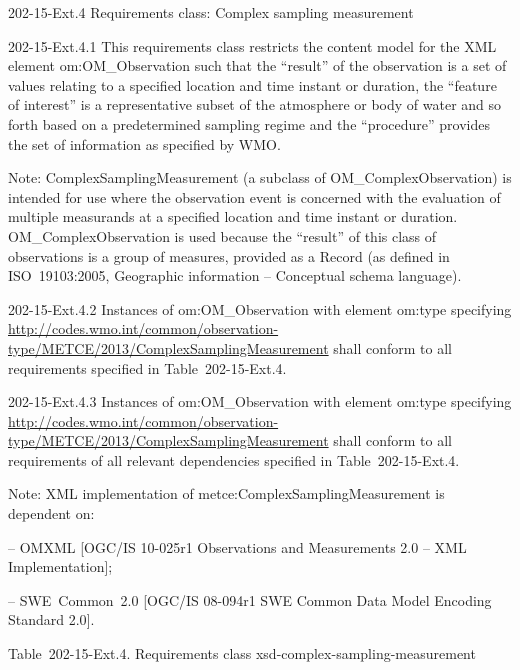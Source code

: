 202-15-Ext.4 Requirements class: Complex sampling measurement

202-15-Ext.4.1 This requirements class restricts the content model for the XML element om:OM\_Observation such that the ``result'' of the observation is a set of values relating to a specified location and time instant or duration, the ``feature of interest'' is a representative subset of the atmosphere or body of water and so forth based on a predetermined sampling regime and the ``procedure'' provides the set of information as specified by WMO.

Note: ComplexSamplingMeasurement (a subclass of OM\_ComplexObservation) is intended for use where the observation event is concerned with the evaluation of multiple measurands at a specified location and time instant or duration. OM\_ComplexObservation is used because the ``result'' of this class of observations is a group of measures, provided as a Record (as defined in ISO~19103:2005, Geographic information -- Conceptual schema language).

202-15-Ext.4.2 Instances of om:OM\_Observation with element om:type specifying \url{http://codes.wmo.int/common/observation-type/METCE/2013/ComplexSamplingMeasurement} shall conform to all requirements specified in Table~202-15-Ext.4.

202-15-Ext.4.3 Instances of om:OM\_Observation with element om:type specifying \url{http://codes.wmo.int/common/observation-type/METCE/2013/ComplexSamplingMeasurement} shall conform to all requirements of all relevant dependencies specified in Table~202-15-Ext.4.

Note: XML implementation of metce:ComplexSamplingMeasurement is dependent on:

-- OMXML {[}OGC/IS 10-025r1 Observations and Measurements 2.0 -- XML Implementation{]};

-- SWE~Common~2.0 {[}OGC/IS 08-094r1 SWE Common Data Model Encoding Standard 2.0{]}.

Table~202-15-Ext.4. Requirements class xsd-complex-sampling-measurement

